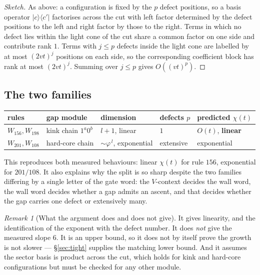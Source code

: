 \documentclass[11pt]{article}
\theoremstyle{plain}
\theoremstyle{remark}
\newtheorem{remark}{Remark}
\begin{document}
\begin{proof}[Sketch]
As above: a configuration is fixed by the $p$ defect positions, so a basis
operator $|c\rangle\langle c'|$ factorises across the cut with left factor
determined by the defect positions to the left and right factor by those to the
right. Terms in which no defect lies within the light cone of the cut share a
common factor on one side and contribute rank $1$. Terms with $j \le p$ defects
inside the light cone are labelled by at most $(2vt)^{j}$ positions on each
side, so the corresponding coefficient block has rank at most $(2vt)^{j}$.
Summing over $j \le p$ gives $O((vt)^p)$.
\end{proof}

\subsection{The two families}

\begin{center}
\begin{tabular}{lllll}
\toprule
rules & gap module & dimension & defects $p$ & predicted $\chi(t)$ \\
\midrule
$W_{156}, W_{198}$ & kink chain $1^a0^b$ & $l+1$, linear & $1$ &
  $O(t)$, \textbf{linear} \\
$W_{201}, W_{108}$ & hard-core chain & $\sim\varphi^{\,l}$, exponential &
  extensive & exponential \\
\bottomrule
\end{tabular}
\end{center}

\noindent This reproduces both measured behaviours: linear $\chi(t)$ for rule
$156$, exponential for $201/108$. It also explains why the split is so sharp
despite the two families differing by a single letter of the gate word: the
$V$-context decides the wall word, the wall word decides whether a gap admits an
ascent, and that decides whether the gap carries one defect or extensively many.

\begin{remark}[What the argument does and does not give]
It gives linearity, and the identification of the exponent with the defect
number. It does \emph{not} give the measured slope $6$. It is an upper bound, so
it does not by itself prove the growth is not slower --- \S\ref{sec:tight}
supplies the matching lower bound. And it assumes the sector basis is product
across the cut, which holds for kink and hard-core configurations but must be
checked for any other module.
\end{remark}
\end{document}
